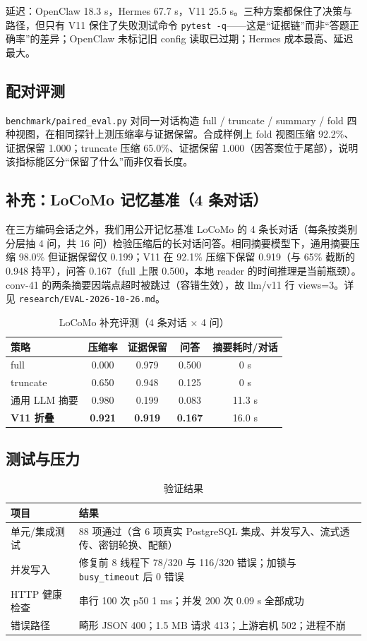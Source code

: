 \documentclass[11pt,a4paper]{ctexart}
\begin{document}
延迟：OpenClaw 18.3 s，Hermes 67.7 s，V11 25.5 s。三种方案都保住了决策与路径，但只有 V11 保住了失败测试命令 \texttt{pytest -q}——这是“证据链”而非“答题正确率”的差异；OpenClaw 未标记旧 config 读取已过期；Hermes 成本最高、延迟最大。

\subsection{配对评测}
\texttt{benchmark/paired\_eval.py} 对同一对话构造 full / truncate / summary / fold 四种视图，在相同探针上测压缩率与证据保留。合成样例上 fold 视图压缩 92.2\%、证据保留 1.000；truncate 压缩 65.0\%、证据保留 1.000（因答案位于尾部），说明该指标能区分“保留了什么”而非仅看长度。

\subsection{补充：LoCoMo 记忆基准（4 条对话）}
在三方编码会话之外，我们用公开记忆基准 LoCoMo 的 4 条长对话（每条按类别分层抽 4 问，共 16 问）检验压缩后的长对话问答。相同摘要模型下，通用摘要压缩 98.0\% 但证据保留仅 0.199；V11 在 92.1\% 压缩下保留 0.919（与 65\% 截断的 0.948 持平），问答 0.167（full 上限 0.500，本地 reader 的时间推理是当前瓶颈）。conv-41 的两条摘要因端点超时被跳过（容错生效），故 llm/v11 行 views=3。详见 \texttt{research/EVAL-2026-10-26.md}。

\begin{table}[htbp]
\centering
\caption{LoCoMo 补充评测（4 条对话 × 4 问）}
\begin{tabular}{lcccc}
\toprule
策略 & 压缩率 & 证据保留 & 问答 & 摘要耗时/对话 \\
\midrule
full & 0.000 & 0.979 & 0.500 & 0 s \\
truncate & 0.650 & 0.948 & 0.125 & 0 s \\
通用 LLM 摘要 & 0.980 & 0.199 & 0.083 & 11.3 s \\
\textbf{V11 折叠} & \textbf{0.921} & \textbf{0.919} & \textbf{0.167} & 16.0 s \\
\bottomrule
\end{tabular}
\end{table}

\subsection{测试与压力}
\begin{table}[htbp]
\centering
\caption{验证结果}
\begin{tabularx}{\linewidth}{lX}
\toprule
项目 & 结果 \\
\midrule
单元/集成测试 & 88 项通过（含 6 项真实 PostgreSQL 集成、并发写入、流式透传、密钥轮换、配额） \\
并发写入 & 修复前 8 线程下 78/320 与 116/320 错误；加锁与 \texttt{busy\_timeout} 后 0 错误 \\
HTTP 健康检查 & 串行 100 次 p50 1 ms；并发 200 次 0.09 s 全部成功 \\
错误路径 & 畸形 JSON 400；1.5 MB 请求 413；上游宕机 502；进程不崩 \\
\bottomrule
\end{tabularx}
\end{table}
\end{document}
